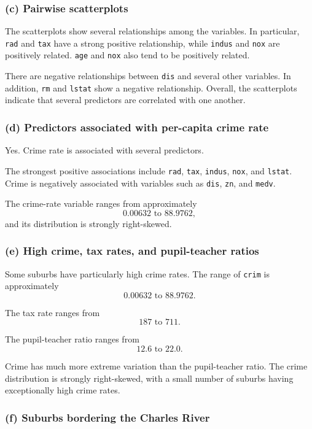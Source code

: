 \documentclass[12pt,a4paper]{article}
\begin{document}
\subsubsection*{(c) Pairwise scatterplots}

The scatterplots show several relationships among the variables. In
particular, \texttt{rad} and \texttt{tax} have a strong positive relationship,
while \texttt{indus} and \texttt{nox} are positively related. \texttt{age}
and \texttt{nox} also tend to be positively related.

There are negative relationships between \texttt{dis} and several other
variables. In addition, \texttt{rm} and \texttt{lstat} show a negative
relationship. Overall, the scatterplots indicate that several predictors
are correlated with one another.

\subsubsection*{(d) Predictors associated with per-capita crime rate}

Yes. Crime rate is associated with several predictors.

The strongest positive associations include \texttt{rad}, \texttt{tax},
\texttt{indus}, \texttt{nox}, and \texttt{lstat}. Crime is negatively
associated with variables such as \texttt{dis}, \texttt{zn}, and
\texttt{medv}.

The crime-rate variable ranges from approximately
\[
0.00632\text{ to }88.9762,
\]
and its distribution is strongly right-skewed.

\subsubsection*{(e) High crime, tax rates, and pupil-teacher ratios}

Some suburbs have particularly high crime rates. The range of \texttt{crim}
is approximately
\[
0.00632\text{ to }88.9762.
\]

The tax rate ranges from
\[
187\text{ to }711.
\]

The pupil-teacher ratio ranges from
\[
12.6\text{ to }22.0.
\]

Crime has much more extreme variation than the pupil-teacher ratio. The
crime distribution is strongly right-skewed, with a small number of suburbs
having exceptionally high crime rates.

\subsubsection*{(f) Suburbs bordering the Charles River}
\end{document}
